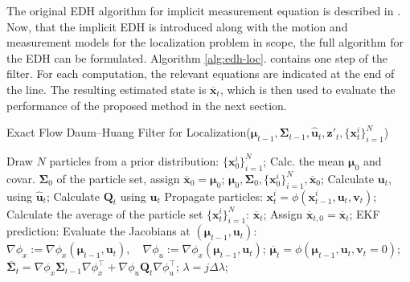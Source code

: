 The original EDH algorithm for implicit measurement equation is described
in \cite{Ding2012}.
Now, that the implicit EDH is introduced along with the motion and measurement models
for the localization problem in scope, the full algorithm for the EDH can be formulated.
Algorithm \ref{alg:edh-loc}. contains one step of the filter.
For each computation, the relevant equations are indicated at the end of the line.
The resulting estimated state is $\overline{\mathbf{x}}_t$, which is then used to evaluate the performance of the proposed method in the next section.
\begin{algorithm}
  \caption{Exact Flow Daum--Huang Filter for Localization($\boldsymbol{\mu}_{t-1},\mathbf{\Sigma}_{t-1},\hat{\mathbf{u}}_t,\mathbf{z}'_t,\{\mathbf{x}_t^i\}_{i=1}^{N}$)}\label{alg:edh-loc}
  \begin{algorithmic}[1]
     
    \State Draw $N$ particles from a prior distribution: $\{\mathbf{x}_0^i\}_{i=1}^{N}$;
    \State Calc. the mean $\boldsymbol\mu_0$ and covar. $\boldsymbol\Sigma_0$ of the particle set, assign $\overline{\mathbf{x}}_0 = \boldsymbol{\mathbf{\mu}}_0$;
    \State\Return $\boldsymbol{\mu}_0,\boldsymbol{\Sigma}_0,\{\mathbf{x}_0^i\}_{i=1}^{N},\overline{\mathbf{x}}_0$;
    \EndIf
    \State Calculate $\mathbf{u}_t$, using $\hat{\mathbf{u}}_t$; \Comment{\eqref{eq:odom-raw-input}-\eqref{eq:odom-delta-input}}
    \State Calculate $\mathbf{Q}_t$ using $\mathbf{u}_t$
    \Comment{\eqref{eq:control-covar}}
    \State Propagate particles: $\mathbf{x}_t^{i} = \phi(\mathbf{x}_{t-1}^{i},\mathbf{u}_t,\mathbf{v}_t)$;
    \Comment{\eqref{eq:prop-x}-\eqref{eq:prop-theta}}
    \State Calculate the average of the particle set $\{\mathbf{x}_t^i\}_{i=1}^{N}$: $\overline{\mathbf{x}}_t$;
    \State Assign $\overline{{\mathbf{x}}}_{t,0} = \overline{\mathbf{x}}_t$;
    \State EKF prediction:
    \State\indent Evaluate the Jacobians at $(\boldsymbol{\mu}_{t-1},\mathbf{u}_t)$:
    \Comment{\eqref{eq:motmodel-jacobi-x}-\eqref{eq:motmodel-jacobi-u}}
    \State\indent\indent $\nabla\phi_x := \nabla\phi_x(\boldsymbol{\mu}_{t-1},\mathbf{u}_t),\quad \nabla\phi_u := \nabla\phi_x(\boldsymbol{\mu}_{t-1},\mathbf{u}_t)$;
    \State\indent$\overline{\boldsymbol{\mu}}_t = \phi(\boldsymbol{\mu}_{t-1},\mathbf{u}_t,\mathbf{v}_t = 0)$;
    \State\indent
    $\overline{\mathbf{\Sigma}}_t = \nabla \phi_x\mathbf{\Sigma}_{t-1}\nabla \phi_x^{\top}
      +\nabla \phi _u\mathbf{Q}_t \nabla \phi_u^{\top}$;
     
    \State $\lambda = j\Delta\lambda$;

\end{algorithmic}
\end{algorithm}
